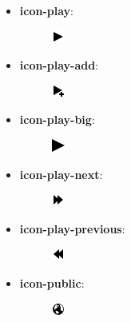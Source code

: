 \documentclass[letterpaper,10pt,english]{sphinxmanual}
\begin{document}
\begin{itemize}
\begin{description}
\end{description}

\item {} \begin{description}
\item[{\textbf{icon-play}:}] \leavevmode
\includegraphics{play.png}

\end{description}

\item {} \begin{description}
\item[{\textbf{icon-play-add}:}] \leavevmode
\includegraphics{play-add.png}

\end{description}

\item {} \begin{description}
\item[{\textbf{icon-play-big}:}] \leavevmode
\includegraphics{play-big.png}

\end{description}

\item {} \begin{description}
\item[{\textbf{icon-play-next}:}] \leavevmode
\includegraphics{play-next.png}

\end{description}

\item {} \begin{description}
\item[{\textbf{icon-play-previous}:}] \leavevmode
\includegraphics{play-previous.png}

\end{description}

\item {} \begin{description}
\item[{\textbf{icon-public}:}] \leavevmode
\includegraphics{public.png}


\end{description}
\end{itemize}
\end{document}
